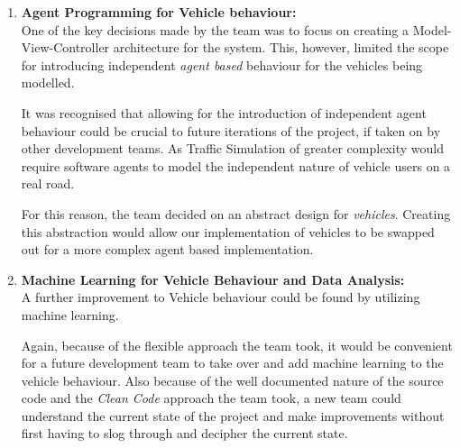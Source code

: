 \documentclass[11pt]{article}
\begin{document}
{\begin{enumerate}
\begin{enumerate}
	Although the team decided that it would be detrimental to provided such functionality within the original project, due to time constraints and a limited number of iterations, and that it would be more productive to focus on the more fundamental aspects of Traffic Simulation software so that our imagined customers would have access to usable software as early as possible.
	
	However, because the team recognized the importance of overcoming the scalability problem they made it a goal to allow for future developers to introduce distributed deployment with as little complication as possible.
	
	The fundamental road network data structure kept the transitions between different roads and junctions as simple and lightweight as possible allowing those same transitions to be carried out over a network by introducing a transfer protocol to mimic the transition.\\
	
	\item \textbf{Agent Programming for Vehicle behaviour:}
	\\
	
	One of the key decisions made by the team was to focus on creating a Model-View-Controller architecture for the system. This, however, limited the scope for introducing independent \textit{agent based} behaviour for the vehicles being modelled.
	
	It was recognised that allowing for the introduction of independent agent behaviour could be crucial to future iterations of the project, if taken on by other development teams. As Traffic Simulation of greater complexity would require software agents to model the independent nature of vehicle users on a real road.
	
	For this reason, the team decided on an abstract design for \textit{vehicles}. Creating this abstraction would allow our implementation of vehicles to be swapped out for a more complex agent based implementation.\\
	
	\item \textbf{Machine Learning for Vehicle Behaviour and Data Analysis:}
	\\
	
	A further improvement to Vehicle behaviour could be found by utilizing machine learning.
	
	Again, because of the flexible approach the team took, it would be convenient for a future development team to take over and add machine learning to the vehicle behaviour. Also because of the well documented nature of the source code and the \textit{Clean Code} \cite{MartinRC08} approach the team took, a new team could understand the current state of the project and make improvements without first having to slog through and decipher the current state.
	

\end{enumerate}
\end{enumerate}}
\end{document}
